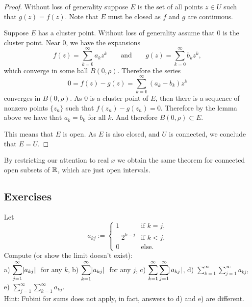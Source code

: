\begin{proof}
Without loss of generality suppose $E$ is the set of all points $z \in U$ such that
$g(z)=f(z)$.  Note that $E$ must be closed as $f$ and $g$ are continuous.

Suppose $E$ has a cluster point.  Without loss of generality assume that $0$ is the cluster point.  Near 0,
we have the expansions
\begin{equation*}
f(z) = \sum_{k=0}^\infty a_k {z}^k 
\qquad
\text{and}
\qquad
g(z) = \sum_{k=0}^\infty b_k {z}^k ,
\end{equation*}
which converge in some ball $B(0,\rho)$.  Therefore the series
\begin{equation*}
0 = f(z)-g(z) = 
\sum_{k=0}^\infty (a_k-b_k) z^k
\end{equation*}
converges in $B(0,\rho)$.  As $0$ is a cluster point of $E$, then there
is a sequence of nonzero points $\{ z_n \}$ such that
$f(z_n) -g(z_n) = 0$.  Therefore by the lemma above we have
that $a_k = b_k$ for all $k$.  And therefore $B(0,\rho) \subset E$.

This means that $E$ is open.  As $E$ is also closed, and $U$ is connected, we conclude that $E = U$.
\end{proof}

By restricting our attention to real $x$ we obtain the same
theorem for connected open subsets of ${\mathbb{R}}$, which are just open intervals.

\subsection{Exercises}

\begin{exercise}
Let
\begin{equation*}
a_{kj} :=
\begin{cases}
1 & \text{if $k=j$,}\\
-2^{k-j} & \text{if $k<j$,}\\
0 & \text{else.}
\end{cases}
\end{equation*}
Compute (or show the limit doesn't exist):
\\
a) $\displaystyle \sum_{j=1}^\infty \lvert {a_{kj}} \rvert~$ for any $k$,
\hspace{\fill}
b) $\displaystyle \sum_{k=1}^\infty \lvert {a_{kj}} \rvert~$ for any $j$,
\hspace{\fill}
c)
$\displaystyle \sum_{k=1}^\infty \sum_{j=1}^\infty \lvert {a_{kj}} \rvert$,
\hspace{\fill}
d) $\displaystyle \sum_{k=1}^\infty \sum_{j=1}^\infty a_{kj}$,
\hspace{\fill}
e)
$\displaystyle \sum_{j=1}^\infty \sum_{k=1}^\infty a_{kj}$.
\\
Hint: Fubini for sums does not apply, in fact, answers to
d) and e) are different.
\end{exercise}


